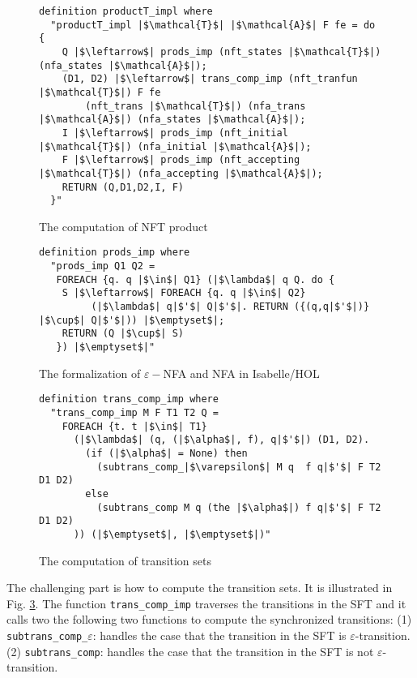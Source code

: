 \documentclass[a4paper,UKenglish,cleveref, autoref, thm-restate]{lipics-v2021}
\begin{document}
\begin{figure}[hbt!]
	\begin{lstlisting}
definition productT_impl where
  "productT_impl |$\mathcal{T}$| |$\mathcal{A}$| F fe = do {
    Q |$\leftarrow$| prods_imp (nft_states |$\mathcal{T}$|) (nfa_states |$\mathcal{A}$|);
    (D1, D2) |$\leftarrow$| trans_comp_imp (nft_tranfun |$\mathcal{T}$|) F fe 
        (nft_trans |$\mathcal{T}$|) (nfa_trans |$\mathcal{A}$|) (nfa_states |$\mathcal{A}$|);
    I |$\leftarrow$| prods_imp (nft_initial |$\mathcal{T}$|) (nfa_initial |$\mathcal{A}$|);
    F |$\leftarrow$| prods_imp (nft_accepting |$\mathcal{T}$|) (nfa_accepting |$\mathcal{A}$|);
    RETURN (Q,D1,D2,I, F)
  }"
\end{lstlisting}
\caption{The computation of NFT product}
\label{fig-compute-nft-product}
\end{figure}



\begin{figure}[hbt!]
	\begin{lstlisting}
definition prods_imp where
  "prods_imp Q1 Q2 =
   FOREACH {q. q |$\in$| Q1} (|$\lambda$| q Q. do {
    S |$\leftarrow$| FOREACH {q. q |$\in$| Q2}
         (|$\lambda$| q|$'$| Q|$'$|. RETURN ({(q,q|$'$|)} |$\cup$| Q|$'$|)) |$\emptyset$|;
    RETURN (Q |$\cup$| S)
   }) |$\emptyset$|"
\end{lstlisting}
\caption{The formalization of $\varepsilon-$NFA and NFA in Isabelle/HOL}
\label{fig-def-prods_imp}
\end{figure}



\begin{figure}[hbt!]
	\begin{lstlisting}
definition trans_comp_imp where
  "trans_comp_imp M F T1 T2 Q =
    FOREACH {t. t |$\in$| T1}
      (|$\lambda$| (q, (|$\alpha$|, f), q|$'$|) (D1, D2). 
        (if (|$\alpha$| = None) then 
          (subtrans_comp_|$\varepsilon$| M q  f q|$'$| F T2 D1 D2)
        else 
          (subtrans_comp M q (the |$\alpha$|) f q|$'$| F T2 D1 D2)
      )) (|$\emptyset$|, |$\emptyset$|)"
\end{lstlisting}
\caption{The computation of transition sets}
\label{fig-def-prods-imp}
\end{figure}

The challenging part is how to compute the transition sets. It is illustrated in Fig. \ref{fig-def-prods-imp}. The function \texttt{trans\_comp\_imp} traverses the transitions in the SFT and it calls two the following two functions to compute the synchronized transitions:
(1) \texttt{subtrans\_comp\_$\varepsilon$}: handles the case that the transition in the SFT is $\varepsilon$-transition.
(2) \texttt{subtrans\_comp}: handles the case that the transition in the SFT is not $\varepsilon$-transition.
\end{document}
